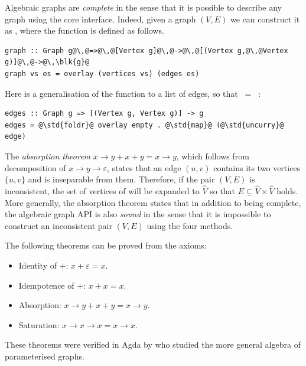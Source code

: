 Algebraic graphs are \emph{complete} in the sense that it is possible to describe
any graph using the core interface. Indeed, given a graph $(V,E)$ we can construct
it as , where the function  is defined as follows.

\begin{verbatim}
graph :: Graph g@\,@=>@\,@[Vertex g]@\,@->@\,@[(Vertex g,@\,@Vertex g)]@\,@->@\,\blk{g}@
graph vs es = overlay (vertices vs) (edges es)
\end{verbatim}

Here  is a generalisation of the function  to a list of edges,
so that  $\ =\ $ :

\begin{verbatim}
edges :: Graph g => [(Vertex g, Vertex g)] -> g
edges = @\std{foldr}@ overlay empty . @\std{map}@ (@\std{uncurry}@ edge)
\end{verbatim}

The \emph{absorption theorem} $x \rightarrow y + x + y = x \rightarrow y$, which
follows from decomposition of $x \rightarrow y \rightarrow \varepsilon$, states
that an edge $(u,v)$ contains its two vertices $\{u,v\}$ and is inseparable from
them. Therefore, if the pair $(V,E)$ is inconsistent, the set of vertices of
 will be expanded to $\hat{V}$ so that
$E\subseteq \hat{V}\times \hat{V}$ holds. More generally, the absorption
theorem states that in addition to being complete, the algebraic graph
API is also \emph{sound} in the sense that it is impossible to construct
an inconsistent pair $(V,E)$ using the four  methods.

The following theorems can be proved from the axioms:

\begin{itemize}
    \item Identity of $+$: $x + \varepsilon = x$.
    \item Idempotence of $+$: $x + x = x$.
    \item Absorption: $x \rightarrow y + x + y = x \rightarrow y$.
    \item Saturation: $x \rightarrow x \rightarrow x = x \rightarrow x$.
\end{itemize}

These theorems were verified in Agda by \citet{2014_alekseyev_phd}
who studied the more general algebra of parameterised graphs.

